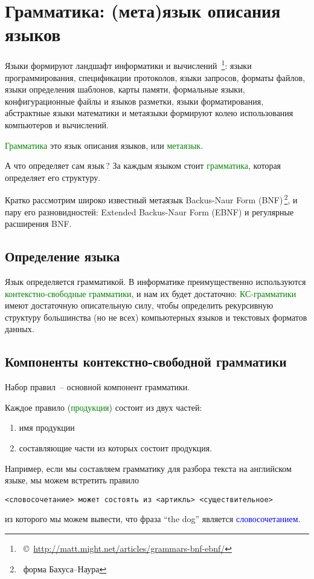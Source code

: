 \documentclass[oneside,10pt]{article}
\renewcommand{\emph}[1]{\textcolor{blue}{#1}}
\newcommand{\note}[1]{\,\footnote{\ #1}}
\newcommand{\cp}[1]{\note{\copyright\ #1}}
\newcommand{\term}[1]{\textcolor{green}{#1}}
\begin{document}
\clearpage
\section{Грамматика: (мета)язык описания языков}\label{grammar}

Языки формируют ландшафт информатики и вычислений
\cp{\url{http://matt.might.net/articles/grammars-bnf-ebnf/}}:
языки программирования, спецификации протоколов, языки запросов, форматы файлов,
языки определения шаблонов, карты памяти, формальные языки, конфигурационные
файлы и языков разметки, языки форматирования, абстрактные языки математики и
метаязыки формируют колею использования компьютеров и вычислений.
\begin{framed}
\term{Грамматика} это язык описания языков, или \term{метаязык}.
\end{framed}
А что определяет сам язык\,?
За каждым языком стоит \term{грамматика}, которая определяет его структуру.

\noindent
Кратко рассмотрим широко известный метаязык Backus-Naur Form
(BNF)\note{форма Бахуса--Наура}, и пару его разновидностей: Extended
Backus-Naur Form (EBNF) и регулярные расширения BNF.

\subsection{Определение языка}

Язык определяется грамматикой. В информатике преимущественно используются
\term{контекстно-свободные грамматики}, и нам их будет достаточно:
\term{КС-грамматики} имеют достаточную описательную силу, чтобы определить
рекурсивную структуру большинства (но не всех) компьютерных языков и текстовых
форматов данных.

\subsection{Компоненты контекстно-свободной грамматики}

Набор правил\ -- основной компонент грамматики.

\bigskip
Каждое правило (\term{продукция}) состоит из двух частей:
\begin{enumerate}
  \item имя продукции
  \item составляющие части из которых состоит продукция. 
\end{enumerate}

Например, если мы составляем грамматику для разбора текста на английском языке,
мы можем встретить правило
\begin{verbatim}
<словосочетание> может состоять из <артикль> <существительное>
\end{verbatim}
из которого мы можем вывести, что фраза ``the dog'' является
\emph{словосочетанием}.
\end{document}
